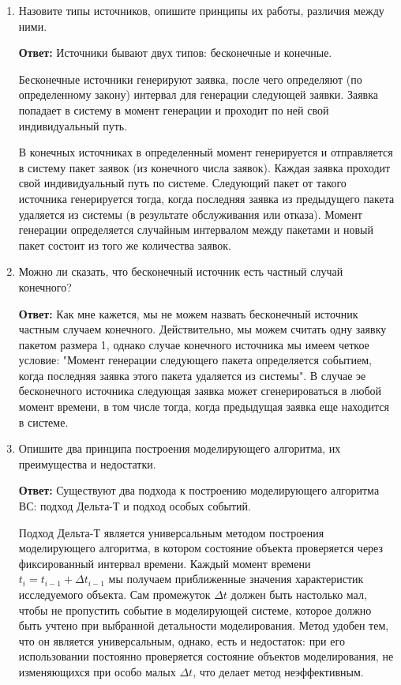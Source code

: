 \documentclass[a4paper, 14pt]{article}
\begin{document}
\begin{enumerate}
	\item Назовите типы источников, опишите принципы их работы, различия между ними.

	      \textbf{Ответ:} Источники бывают двух типов: бесконечные и конечные.

	      Бесконечные источники генерируют заявка, после чего определяют (по определенному закону) интервал для генерации следующей заявки. Заявка попадает в систему в момент генерации и проходит по ней свой индивидуальный путь.

	      В конечных источниках в определенный момент генерируется и отправляется в систему пакет заявок (из конечного числа заявок). Каждая заявка проходит свой индивидуальный путь по системе. Следующий пакет от такого источника генерируется тогда, когда последняя заявка из предыдущего пакета удаляется из системы (в результате обслуживания или отказа). Момент генерации определяется случайным интервалом между пакетами и новый пакет состоит из того же количества заявок.
	\item Можно ли сказать, что бесконечный источник есть частный случай конечного?

	      \textbf{Ответ:} Как мне кажется, мы не можем назвать бесконечный источник частным случаем конечного. Действительно, мы можем считать одну заявку пакетом размера 1, однако случае конечного источника мы имеем четкое условие: "Момент генерации следующего пакета определяется событием, когда последняя заявка этого пакета удаляется из системы". В случае эе бесконечного источника следующая заявка может сгенерироваться в любой момент времени, в том числе тогда, когда предыдущая заявка еще находится в системе.
	\item Опишите два принципа построения моделирующего алгоритма, их преимущества и недостатки.

	      \textbf{Ответ:} Существуют два подхода к построению моделирующего алгоритма ВС: подход Дельта-Т и подход особых событий.

	      Подход Дельта-Т является универсальным методом построения моделирующего алгоритма, в котором состояние объекта проверяется через фиксированный интервал времени. Каждый момент времени $t_i=t_{i-1}+\Delta{t_{i-1}}$ мы получаем приближенные значения характеристик исследуемого объекта. Сам промежуток $\Delta{t}$ должен быть настолько мал, чтобы не пропустить событие в моделирующей системе, которое должно быть учтено при выбранной детальности моделирования. Метод удобен тем, что он является универсальным, однако, есть и недостаток: при его использовании постоянно проверяется состояние объектов моделирования, не изменяющихся при особо малых $\Delta{t}$, что делает метод неэффективным.


\end{enumerate}
\end{document}
